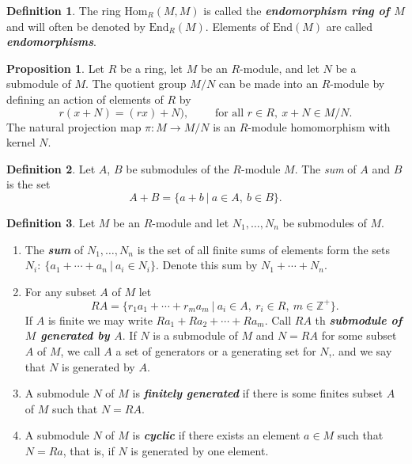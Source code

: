 \documentclass[10pt]{article}
\theoremstyle{definition}
\newtheorem*{prop}{Proposition}
\newtheorem*{defn}{Definition}
\newcommand{\nl}{\vspace{7em}}
\newcommand{\ra}{\rightarrow}
\newcommand{\Z}{\mathbb{Z}}
\newcommand{\Hom}{\text{Hom}}
\newcommand{\End}{\text{End}}
\begin{document}
\nl

\begin{defn}
The ring $\Hom_R(M,M)$ is called the \textbf{\textit{endomorphism ring of $M$}} and will often be denoted by $\End_R(M)$. Elements of $\End(M)$ are called \textbf{\textit{endomorphisms}}.
\end{defn}

\nl

\begin{prop}
Let $R$ be a ring, let $M$ be an $R$-module, and let $N$ be a submodule of $M$. The quotient group $M/N$ can be made into an $R$-module by defining an action of elements of $R$ by
\[r(x + N) = (rx) + N),\qquad\text{ for all }r\in R,\ x + N \in M/N.\]
The natural projection map $\pi:M\ra M/N$ is an $R$-module homomorphism with kernel $N$.
\end{prop}

\nl

\begin{defn}
Let $A$, $B$ be submodules of the $R$-module $M$. The \textit{sum} of $A$ and $B$ is the set 
\[A + B = \{a + b\ |\ a\in A,\ b\in B\}.\]
\end{defn}

\nl

\begin{defn}
Let $M$ be an $R$-module and let $N_1,\ldots,N_n$ be submodules of $M$.
\begin{enumerate}
\item The \textbf{\textit{sum}} of $N_1,\ldots,N_n$ is the set of all finite sums of elements form the sets $N_i:\ \{a_1+\cdots+a_n\ |\ a_i\in N_i\}$. Denote this sum by $N_1+\cdots +N_n$.
\item For any subset $A$ of $M$ let
\[RA = \{r_1a_1+\cdots+r_ma_m\ |\ a_i\in A,\ r_i \in R,\ m\in\Z^+\}.\]
If $A$ is finite we may write $Ra_1 + Ra_2+\cdots +Ra_m$. Call $RA$ th \textit{\textbf{submodule of $M$ generated by $A$}}. If $N$ is a submodule of $M$ and $N = RA$ for some subset $A$ of $M$, we call $A$ a set of generators or a generating set for $N$,. and we say that $N$ is generated by $A$.
\item A submodule $N$ of $M$ is \textbf{\textit{finitely generated}} if there is some finites subset $A$ of $M$ such that $N = RA$.
\item A submodule $N$ of $M$ is \textit{\textbf{cyclic}} if there exists an element $a\in M$ such that $N = Ra$, that is, if $N$ is generated by one element.
\end{enumerate}
\end{defn}
\end{document}
